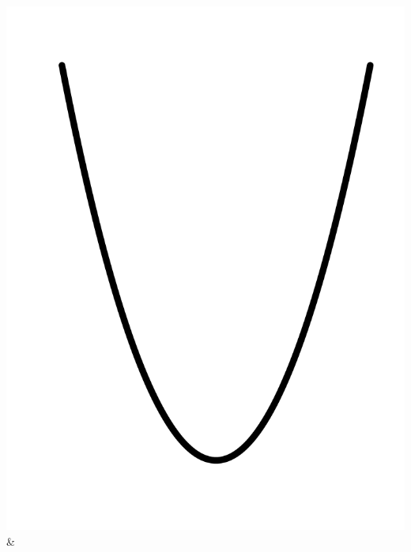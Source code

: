 \documentclass[
  letterpaper,
  DIV=11,
  numbers=noendperiod,
  oneside]{article}
\begin{document}
\begin{multicols}{2}
\begin{table}
\begin{minipage}[t]{\linewidth}
{\begin{longtable}[]
\includegraphics{Preliminaries/www/pb-square.png} &

\end{longtable}}
\end{minipage}
\end{table}
\end{multicols}
\end{document}
